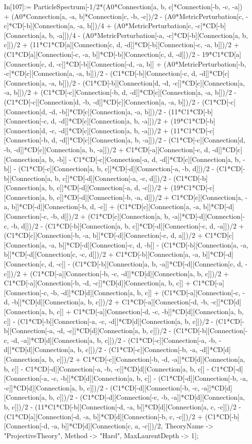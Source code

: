 In[107]:= ParticleSpectrum[-1/2*(A0*Connection[a, b, c]*Connection[-b, -c, -a]) + (A0*Connection[a, -a, b]*Connection[c, -b, -c])/2 - (A0*MetricPerturbation[c, -c]*CD[-b][Connection[a, -a, b]])/4 + (A0*MetricPerturbation[c, -c]*CD[-b][Connection[a, b, -a]])/4 - (A0*MetricPerturbation[-a, -c]*CD[-b][Connection[a, b, c]])/2 + (11*C1*CD[a][Connection[c, d, -d]]*CD[-b][Connection[-c, -a, b]])/2 + (C1*CD[a][Connection[-c, -a, b]]*CD[-b][Connection[c, d, -d]])/2 - 19*C1*CD[a][Connection[c, d, -c]]*CD[-b][Connection[-d, -a, b]] + (A0*MetricPerturbation[-b, -c]*CD[c][Connection[a, -a, b]])/2 - (C1*CD[-b][Connection[-c, d, -d]]*CD[c][Connection[a, -a, b]])/2 - (C1*CD[-b][Connection[d, -d, -c]]*CD[c][Connection[a, -a, b]])/2 + (C1*CD[-c][Connection[-b, d, -d]]*CD[c][Connection[a, -a, b]])/2 - (C1*CD[-c][Connection[d, -b, -d]]*CD[c][Connection[a, -a, b]])/2 - (C1*CD[-c][Connection[d, -d, -b]]*CD[c][Connection[a, -a, b]])/2 - (11*C1*CD[-b][Connection[-c, d, -d]]*CD[c][Connection[a, b, -a]])/2 + (19*C1*CD[-b][Connection[d, -c, -d]]*CD[c][Connection[a, b, -a]])/2 + (11*C1*CD[-c][Connection[-b, d, -d]]*CD[c][Connection[a, b, -a]])/2 - (C1*CD[-c][Connection[d, -b, -d]]*CD[c][Connection[a, b, -a]])/2 + C1*CD[-a][Connection[-c, d, -d]]*CD[c][Connection[a, b, -b]] - C1*CD[-c][Connection[-a, d, -d]]*CD[c][Connection[a, b, -b]] - (C1*CD[-c][Connection[a, b, c]]*CD[-d][Connection[-a, -b, d]])/2 - (C1*CD[-b][Connection[a, b, c]]*CD[-d][Connection[-a, -c, d]])/2 - (C1*CD[-b][Connection[a, b, c]]*CD[-d][Connection[-a, d, -c]])/2 + (19*C1*CD[-c][Connection[a, b, c]]*CD[-d][Connection[-b, -a, d]])/2 + C1*CD[c][Connection[a, -a, b]]*CD[-d][Connection[-b, d, -c]] + (C1*CD[c][Connection[a, -a, b]]*CD[-d][Connection[-c, -b, d]])/2 + (C1*CD[c][Connection[a, b, -a]]*CD[-d][Connection[-c, -b, d]])/2 - (C1*CD[-b][Connection[a, b, c]]*CD[-d][Connection[-c, d, -a]])/2 + (C1*CD[c][Connection[-b, -a, b]]*CD[-d][Connection[-c, d, a]])/2 + C1*CD[c][Connection[a, -a, b]]*CD[-d][Connection[-c, d, -b]] - (C1*CD[-b][Connection[a, -a, b]]*CD[-d][Connection[c, -c, d]])/2 + C1*CD[-b][Connection[a, -a, b]]*CD[-d][Connection[c, d, -c]] - (C1*CD[-b][Connection[a, b, -a]]*CD[-d][Connection[c, d, -c]])/2 + (C1*CD[-a][Connection[-b, -c, -d]]*CD[d][Connection[a, b, c]])/2 + C1*CD[-a][Connection[-b, -d, -c]]*CD[d][Connection[a, b, c]] + C1*CD[-a][Connection[-c, -b, -d]]*CD[d][Connection[a, b, c]] + (C1*CD[-a][Connection[-c, -d, -b]]*CD[d][Connection[a, b, c]])/2 + C1*CD[-a][Connection[-d, -b, -c]]*CD[d][Connection[a, b, c]] + C1*CD[-a][Connection[-d, -c, -b]]*CD[d][Connection[a, b, c]] - (C1*CD[-b][Connection[-a, -c, -d]]*CD[d][Connection[a, b, c]])/2 - (C1*CD[-b][Connection[-a, -d, -c]]*CD[d][Connection[a, b, c]])/2 - (C1*CD[-b][Connection[-c, -d, -a]]*CD[d][Connection[a, b, c]])/2 - (C1*CD[-c][Connection[-a, -b, -d]]*CD[d][Connection[a, b, c]])/2 - (C1*CD[-c][Connection[-b, -a, -d]]*CD[d][Connection[a, b, c]])/2 + C1*CD[-c][Connection[-b, -d, -a]]*CD[d][Connection[a, b, c]] - C1*CD[-d][Connection[-a, -b, -c]]*CD[d][Connection[a, b, c]] - C1*CD[-d][Connection[-a, -c, -b]]*CD[d][Connection[a, b, c]] - (C1*CD[-d][Connection[-b, -a, -c]]*CD[d][Connection[a, b, c]])/2 - (C1*CD[-d][Connection[-b, -c, -a]]*CD[d][Connection[a, b, c]])/2 - (C1*CD[-d][Connection[-c, -b, -a]]*CD[d][Connection[a, b, c]])/2 - (11*C1*CD[-b][Connection[-d, -a, b]]*CD[d][Connection[a, c, -c]])/2 - (C1*CD[a][Connection[-d, -a, b]]*CD[d][Connection[-b, c, -c]])/2 + (C1*CD[-b][Connection[-d, -a, b]]*CD[d][Connection[c, a, -c]])/2, TheoryName -> "ProjectiveTheory", Method -> "Hard", MaxLaurentDepth -> 1]; 